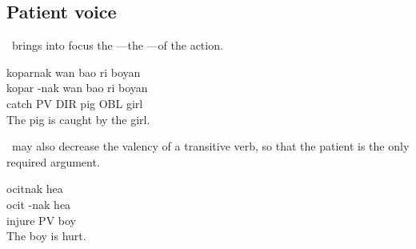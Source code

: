 \subsection{Patient voice}
\PV~brings into focus the ---the ---of
the action.
\begin{examples}
	\ex
	\label{ex:pigcaught}
	\script koparnak wan bao ri boyan \\
	\bits kopar -nak wan bao ri boyan \\
	\gloss catch PV DIR pig OBL girl \\
	\tr The pig is caught by the girl.
\end{examples}

\PV~may also decrease the valency of a transitive verb, so that
the patient is the only required argument.
\begin{examples}
	\ex
	\label{ex:kidinjured}
	\script ocitnak hea \\
	\bits ocit -nak hea \\
	\gloss injure PV boy \\
	\tr The boy is hurt.
\end{examples}

